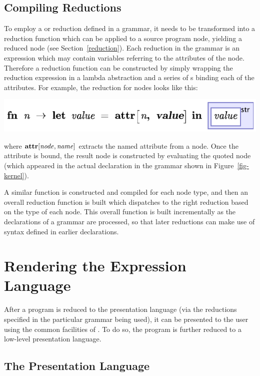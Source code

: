 \subsection{Compiling Reductions}
To employ a  or  reduction defined in a grammar, it needs to be transformed into a reduction function which can be applied to a source program node, yielding a reduced node (see Section~\ref{reduction}). Each reduction in the grammar is an expression which may contain variables referring to the attributes of the node. Therefore a reduction function can be constructed by simply wrapping the reduction expression in a lambda abstraction and a series of s binding each of the attributes. For example, the reduction for  nodes looks like this:
\begin{center}
\includegraphics{src/image/reduce.pdf}
\end{center}
where $\textbf{attr}[\mathit{node}, \mathit{name}]$ extracts the named attribute from a node. Once the  attribute is bound, the result node is constructed by evaluating the quoted  node (which appeared in the actual declaration in the grammar shown in Figure~\ref{fig-kernel}).

A similar function is constructed and compiled for each node type, and then an overall reduction function is built which dispatches to the right reduction based on the type of each node. This overall function is built incrementally as the declarations of a grammar are processed, so that later reductions can make use of syntax defined in earlier declarations.

%
%
\section{Rendering the Expression Language}

After a program is reduced to the  presentation language (via the  reductions specified in the particular grammar being used), it can be presented to the user using the common facilities of \Meta. To do so, the program is further reduced to a low-level presentation language.


\subsection{The \textit{} Presentation Language}
\label{view}

